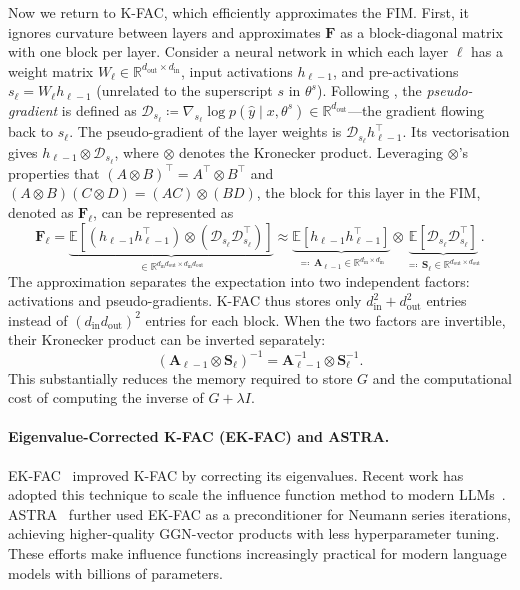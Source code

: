Now we return to K-FAC, which efficiently approximates the FIM. First, it ignores curvature between layers and approximates $\mathbf{F}$ as a block-diagonal matrix with one block per layer. Consider a neural network in which each layer $\ell$ has a weight matrix $W_\ell \in \mathbb{R}^{d_{\mathrm{out}}\times d_{\mathrm{in}}}$, input activations $h_{\ell-1}$, and pre-activations $s_\ell=W_\ell h_{\ell-1}$ (unrelated to the superscript $s$ in $\theta^s$). Following , the \emph{pseudo-gradient} is defined as $\mathcal{D}_{s_\ell} \coloneqq \nabla_{s_\ell} \log p(\hat{y}\mid x,\theta^s) \in \mathbb{R}^{d_{\text{out}}}$---the gradient flowing back to ${s_\ell}$. The pseudo-gradient of the layer weights is $\mathcal{D}_{s_\ell} h_{\ell-1}^\top$. Its vectorisation gives $h_{\ell-1}\otimes\mathcal{D}_{s_\ell}$, where $\otimes$ denotes the Kronecker product. Leveraging $\otimes$'s properties that $(A\otimes B)^\top = A^\top \otimes B^\top$ and $(A\otimes B)(C\otimes D) = (AC)\otimes (BD)$, the block for this layer in the FIM, denoted as $\mathbf{F}_\ell$, can be represented as
\[
\mathbf{F}_\ell
=
\underbrace{\mathbb{E}\left[
(h_{\ell-1}h_{\ell-1}^\top)
\otimes
(\mathcal{D}_{s_\ell}\mathcal{D}_{s_\ell}^\top)
\right]}_{\in \mathbb{R}^{d_{\text{in}} d_{\text{out}}\times d_{\text{in}} d_{\text{out}}}}
\approx
\underbrace{
\mathbb{E}[h_{\ell-1}h_{\ell-1}^\top]
}_{\eqqcolon\,\textbf{A}_{\ell-1} \in \mathbb{R}^{d_{\text{in}}\times d_{\text{in}}}}
\otimes
\underbrace{
\mathbb{E}[\mathcal{D}_{s_\ell}\mathcal{D}_{s_\ell}^\top]
}_{\eqqcolon\,\textbf{S}_\ell \in \mathbb{R}^{d_{\text{out}}\times d_{\text{out}}}}.
\]
The approximation separates the expectation into two independent factors: activations and pseudo-gradients. K-FAC thus stores only $d_{\text{in}}^2+d_{\text{out}}^2$ entries instead of $(d_{\text{in}}d_{\text{out}})^2$ entries for each block. When the two factors are invertible, their Kronecker product can be inverted separately:
\[
(\textbf{A}_{\ell-1}\otimes \textbf{S}_\ell)^{-1}
=
\textbf{A}_{\ell-1}^{-1}\otimes \textbf{S}_\ell^{-1}.
\]
This substantially reduces the memory required to store $G$ and the computational cost of computing the inverse of $G+\lambda I$.

\paragraph{Eigenvalue-Corrected K-FAC (EK-FAC) and ASTRA.}
EK-FAC~ improved K-FAC by correcting its eigenvalues. Recent work has adopted this technique to scale the influence function method to modern LLMs~. ASTRA~ further used EK-FAC as a preconditioner for Neumann series iterations, achieving higher-quality GGN-vector products with less hyperparameter tuning. These efforts make influence functions increasingly practical for modern language models with billions of parameters.



